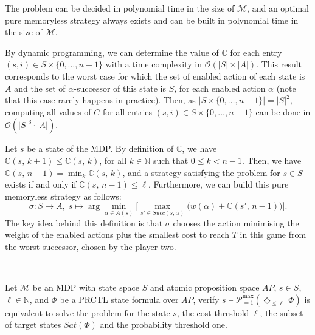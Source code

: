 \begin{theorem} The \SPG{} problem can be decided in polynomial time in the size of $\mathcal{M}$, and %
an optimal pure memoryless strategy always exists and can be built in polynomial time in the size of $\mathcal{M}$.
\end{theorem}
\begin{proof2}
By dynamic programming, we can determine the value of $\mathbb{C}$ for each entry $(s, i) \in S \times \{0, \dots, n-1\}$ with a time complexity in $\mathcal{O}(|S| \times |A|)$. This result corresponds to the worst case for which the set of enabled action of each state is $A$ and the set of $\alpha$-successor of this state is $S$, for each enabled action $\alpha$ (note that this case rarely happens in practice). Then, as $|S \times \{0, \dots, n-1\}| = |S|^2$, computing all values of $C$ for all entries $(s, i) \in S \times \{0, \dots, n-1\}$ can be done in $\mathcal{O}(|S|^3 \cdot |A|)$.
\par
Let $s$ be a state of the MDP. By definition of $\mathbb{C}$, we have $\mathbb{C}(s,\, k + 1) \leq \mathbb{C}(s,\, k)$, for all $k \in \mathbb{N}$ such that $0 \leq k < n-1$.
Then, we have $\mathbb{C}(s, \, n-1) = \min_{k} \mathbb{C}(s, \, k)$, and
a strategy satisfying the \SPG{} problem for $s \in S$ exists if and only if $\mathbb{C}(s,\, n-1) \leq \ell$.
Furthermore, we can build this pure memoryless strategy as follows:
\[
  \sigma : S \rightarrow A, \; s \mapsto \arg \min_{\alpha \in A(s)} \big[ \max_{s' \in Succ(s, \alpha)} \big(w(\alpha) + \mathbb{C}(s',\, n - 1) \big) \big].
\]
The key idea behind this definition is that $\sigma$ chooses the action minimising the weight of the enabled actions plus the smallest cost to reach $T$ in this game from the worst successor, chosen by the player two.

\end{proof2}
$ $\\

\begin{remark}
  Let $\mathcal{M}$ be an MDP with state space $S$ and atomic proposition space $AP$, $s \in S$, $\ell \in \mathbb{N}$, and $\Phi$ be a PRCTL state formula over $AP$,
  verify $s \models \mathcal{P}^{\max}_{=1}(\Diamond_{\leq \ell}\, \Phi)$ is equivalent to solve the \SPG{} problem for the state $s$, the cost threshold $\ell$, the subset of target states $Sat(\Phi)$ and the probability threshold one.
\end{remark}

